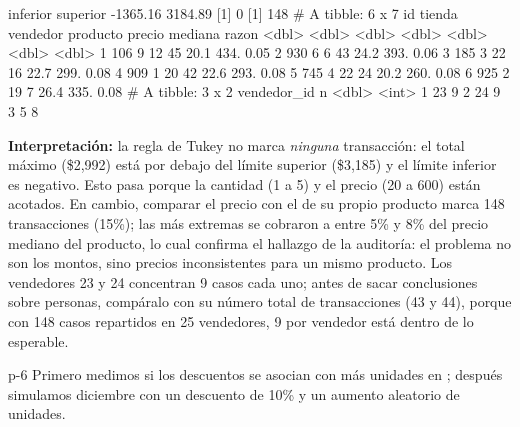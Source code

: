 \begin{rsalida}
inferior superior 
-1365.16  3184.89 
[1] 0
[1] 148
# A tibble: 6 x 7
     id tienda vendedor producto precio mediana razon
  <dbl>  <dbl>    <dbl>    <dbl>  <dbl>   <dbl> <dbl>
1   106      9       12       45   20.1    434.  0.05
2   930      6        6       43   24.2    393.  0.06
3   185      3       22       16   22.7    299.  0.08
4   909      1       20       42   22.6    293.  0.08
5   745      4       22       24   20.2    260.  0.08
6   925      2       19        7   26.4    335.  0.08
# A tibble: 3 x 2
  vendedor_id     n
        <dbl> <int>
1          23     9
2          24     9
3           5     8
\end{rsalida}

\textbf{Interpretación:} la regla de Tukey no marca \emph{ninguna}
transacción: el total máximo (\$2,992) está por debajo del límite superior
(\$3,185) y el límite inferior es negativo. Esto pasa porque la cantidad
(1 a 5) y el precio (20 a 600) están acotados. En cambio, comparar el precio
con el de su propio producto marca 148 transacciones (15\%); las más extremas se cobraron a entre 5\% y
8\% del precio mediano del producto, lo cual confirma
el hallazgo de la auditoría: el problema no son los montos, sino precios
inconsistentes para un mismo producto. Los vendedores 23 y 24 concentran 9
casos cada uno; antes de sacar conclusiones sobre personas, compáralo con su
número total de transacciones (43 y 44), porque con 148 casos repartidos en
25 vendedores, 9 por vendedor está dentro de lo esperable.


\begin{solucion}{p-6}
Primero medimos si los descuentos se asocian con más unidades en
; después simulamos diciembre con un descuento
de 10\% y un aumento aleatorio de unidades.
\end{solucion}


